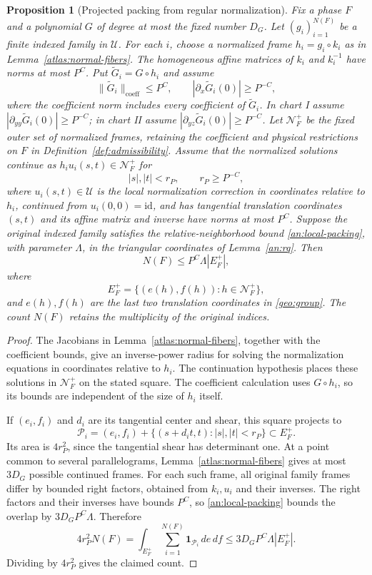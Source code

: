 \documentclass[11pt]{amsart}
\newtheorem{proposition}[theorem]{Proposition}
\theoremstyle{definition}
\theoremstyle{remark}
\numberwithin{equation}{section}
\begin{document}
\begin{proposition}[Projected packing from regular normalization]\label{atlas:projected-packing}
Fix a phase $F$ and a polynomial $G$ of degree at most the fixed number $D_G$. Let $(g_i)_{i=1}^{N(F)}$ be a finite indexed family in $\mathcal U$. For each $i$, choose a normalized frame $h_i=g_i\circ k_i$ as in Lemma~\ref{atlas:normal-fibers}. The homogeneous affine matrices of $k_i$ and $k_i^{-1}$ have norms at most $P^C$. Put $\widetilde G_i=G\circ h_i$ and assume
\[
 \|\widetilde G_i\|_{\mathrm{coeff}}\le P^C,\qquad |\partial_x\widetilde G_i(0)|\ge P^{-C},
\]
where the coefficient norm includes every coefficient of $\widetilde G_i$. In chart I assume $|\partial_{yy}\widetilde G_i(0)|\ge P^{-C}$; in chart II assume $|\partial_{yz}\widetilde G_i(0)|\ge P^{-C}$. Let $\mathcal N_F^+$ be the fixed outer set of normalized frames, retaining the coefficient and physical restrictions on $F$ in Definition~\ref{def:admissibility}. Assume that the normalized solutions continue as $h_i u_i(s,t)\in\mathcal N_F^+$ for
\[
 |s|,|t|<r_P,\qquad r_P\ge P^{-C},
\]
where $u_i(s,t)\in\mathcal U$ is the local normalization correction in coordinates relative to $h_i$, continued from $u_i(0,0)=\mathrm{id}$, and has tangential translation coordinates $(s,t)$ and its affine matrix and inverse have norms at most $P^C$. Suppose the original indexed family satisfies the relative-neighborhood bound \eqref{an:local-packing}, with parameter $\Lambda$, in the triangular coordinates of Lemma~\ref{an:rq}. Then
\[
N(F)\le P^C\Lambda |E_F^+|,
\]
where
\[
 E_F^+=\{(e(h),f(h)):h\in\mathcal N_F^+\},
\]
and $e(h),f(h)$ are the last two translation coordinates in \eqref{geo:group}. The count $N(F)$ retains the multiplicity of the original indices.
\end{proposition}
\begin{proof}
The Jacobians in Lemma~\ref{atlas:normal-fibers}, together with the coefficient bounds, give an inverse-power radius for solving the normalization equations in coordinates relative to $h_i$. The continuation hypothesis places these solutions in $\mathcal N_F^+$ on the stated square. The coefficient calculation uses $G\circ h_i$, so its bounds are independent of the size of $h_i$ itself.

If $(e_i,f_i)$ and $d_i$ are its tangential center and shear, this square projects to
\[
 \mathcal P_i=(e_i,f_i)+\{(s+d_it,t):|s|,|t|<r_P\}\subset E_F^+.
\]
Its area is $4r_P^2$, since the tangential shear has determinant one. At a point common to several parallelograms, Lemma~\ref{atlas:normal-fibers} gives at most $3D_G$ possible continued frames. For each such frame, all original family frames differ by bounded right factors, obtained from $k_i,u_i$ and their inverses. The right factors and their inverses have bounds $P^C$, so \eqref{an:local-packing} bounds the overlap by $3D_GP^C\Lambda$. Therefore
\[
4r_P^2N(F)=\int_{E_F^+}\sum_{i=1}^{N(F)}\mathbf1_{\mathcal P_i}\,de\,df\le3D_GP^C\Lambda|E_F^+|.
\]
Dividing by $4r_P^2$ gives the claimed count.
\end{proof}
\end{document}
